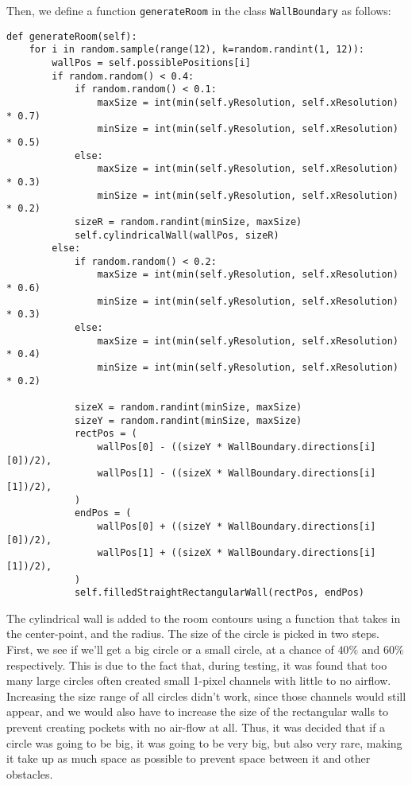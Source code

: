 Then, we define a function \texttt{generateRoom} in the class \texttt{WallBoundary} as follows:
\begin{verbatim}
def generateRoom(self):
    for i in random.sample(range(12), k=random.randint(1, 12)):
        wallPos = self.possiblePositions[i]
        if random.random() < 0.4:
            if random.random() < 0.1:
                maxSize = int(min(self.yResolution, self.xResolution) * 0.7)
                minSize = int(min(self.yResolution, self.xResolution) * 0.5)
            else:
                maxSize = int(min(self.yResolution, self.xResolution) * 0.3)
                minSize = int(min(self.yResolution, self.xResolution) * 0.2)
            sizeR = random.randint(minSize, maxSize)
            self.cylindricalWall(wallPos, sizeR)
        else:
            if random.random() < 0.2:
                maxSize = int(min(self.yResolution, self.xResolution) * 0.6)
                minSize = int(min(self.yResolution, self.xResolution) * 0.3)
            else:
                maxSize = int(min(self.yResolution, self.xResolution) * 0.4)
                minSize = int(min(self.yResolution, self.xResolution) * 0.2)
            
            sizeX = random.randint(minSize, maxSize)
            sizeY = random.randint(minSize, maxSize)
            rectPos = (
                wallPos[0] - ((sizeY * WallBoundary.directions[i][0])/2),
                wallPos[1] - ((sizeX * WallBoundary.directions[i][1])/2),
            )
            endPos = (
                wallPos[0] + ((sizeY * WallBoundary.directions[i][0])/2),
                wallPos[1] + ((sizeX * WallBoundary.directions[i][1])/2),
            )
            self.filledStraightRectangularWall(rectPos, endPos)
\end{verbatim}

The cylindrical wall is added to the room contours using a function that takes in the center-point, and the radius. The size of the circle is picked in two steps. First, we see if we'll get a big circle or a small circle, at a chance of $40\%$ and $60\%$ respectively. This is due to the fact that, during testing, it was found that too many large circles often created small 1-pixel channels with little to no airflow. Increasing the size range of all circles didn't work, since those channels would still appear, and we would also have to increase the size of the rectangular walls to prevent creating pockets with no air-flow at all. Thus, it was decided that if a circle was going to be big, it was going to be very big, but also very rare, making it take up as much space as possible to prevent space between it and other obstacles.

